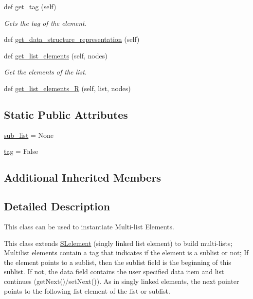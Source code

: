 \begin{DoxyCompactItemize}
def \hyperlink{class_bridges_1_1_m_lelement_1_1_m_lelement_a20efe494cec340d83415c07b5da8d8dd}{get\+\_\+tag} (self)
\begin{DoxyCompactList}\small\item\em Gets the tag of the element. \end{DoxyCompactList}\item 
def \hyperlink{class_bridges_1_1_m_lelement_1_1_m_lelement_a8b4e8441ab968b46e487c64424954b7e}{get\+\_\+data\+\_\+structure\+\_\+representation} (self)
\item 
def \hyperlink{class_bridges_1_1_m_lelement_1_1_m_lelement_adcb6bb39c380a6a8b2c8b5438dfdd738}{get\+\_\+list\+\_\+elements} (self, nodes)
\begin{DoxyCompactList}\small\item\em Get the elements of the list. \end{DoxyCompactList}\item 
def \hyperlink{class_bridges_1_1_m_lelement_1_1_m_lelement_acee0cb1ef6a83ad38aa41b5be4aa2b1b}{get\+\_\+list\+\_\+elements\+\_\+\+R} (self, list, nodes)
\end{DoxyCompactItemize}
\subsection*{Static Public Attributes}
\begin{DoxyCompactItemize}
\item 
\hyperlink{class_bridges_1_1_m_lelement_1_1_m_lelement_ae79f85968687b3c4c72bd56b836d0976}{sub\+\_\+list} = None
\item 
\hyperlink{class_bridges_1_1_m_lelement_1_1_m_lelement_adb11c5e159bc78f59daf34b2ae3c5a58}{tag} = False
\end{DoxyCompactItemize}
\subsection*{Additional Inherited Members}


\subsection{Detailed Description}
This class can be used to instantiate Multi-\/list Elements. 

This class extends \hyperlink{namespace_bridges_1_1_s_lelement}{S\+Lelement} (singly linked list element) to build multi-\/lists; Multilist elements contain a tag that indicates if the element is a sublist or not; If the element points to a sublist, then the sublist field is the beginning of this sublist. If not, the data field contains the user specified data item and list continues (get\+Next()/set\+Next()). As in singly linked elements, the next pointer points to the following list element of the list or sublist.

